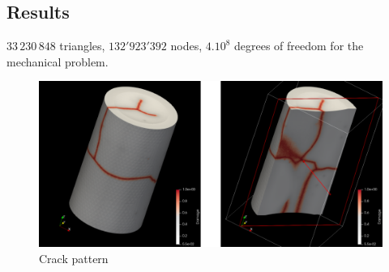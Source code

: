 \subsection{Results}

\(33\,230\,848\) triangles, \(132'923'392\) nodes, \(4.10^8\) degrees of freedom for the mechanical problem.


\begin{figure}[H]
  \centering
  \includegraphics[width=10.cm]{../chapter_02_ef_micromorphic/figures/FuelPelletCracking-results.pdf}
  \caption{Crack pattern}
\end{figure}
